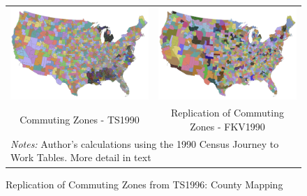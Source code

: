 \begin{figure}[tbh]\centering
\begin{tabular}{cc}
\includegraphics[scale=0.25]{./figures/commutingzones.png}&
\includegraphics[scale=0.17]{./figures/1990_replicationmap_1.png}\\
Commuting Zones - TS1990 & Replication of Commuting Zones - FKV1990 \\
\multicolumn{2}{l}{\footnotesize \textit{Notes:} Author's calculations using the 1990 Census Journey to Work Tables. More detail in text}\\
\end{tabular}
\caption{Replication of Commuting Zones from TS1996: County Mapping \label{fig:czreplication}}
\end{figure}


